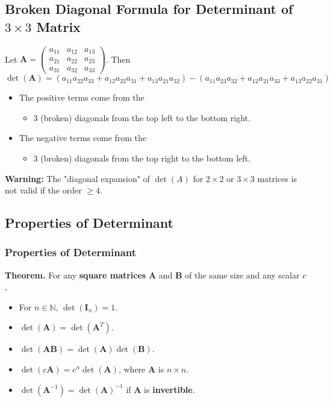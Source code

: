 \documentclass[../ma2001_notes.tex]{subfiles}
\begin{document}
\subsection{Broken Diagonal Formula for Determinant of $3\times 3$ Matrix}
Let \(\bm{A}=\begin{pmatrix}
	a_{11} & a_{12} & a_{13} \\ a_{21} & a_{22} & a_{23} \\
	a_{31} & a_{32} & a_{33}
\end{pmatrix}\). Then
\[\det(\bm{A})=(a_{11}a_{22}a_{33}+a_{12}a_{23}a_{31}+a_{13}a_{21}a_{32})-(a_{11}a_{23}a_{32}+a_{12}a_{21}a_{33}+a_{13}a_{22}a_{31})\]
\begin{itemize}
	\item The positive terms come from the
	\begin{itemize}
		\item 3 (broken) diagonals from the top left to the bottom right.
	\end{itemize}
	\item The negative terms come from the
	\begin{itemize}
		\item 3 (broken) diagonals from the top right to the bottom left.
	\end{itemize}
\end{itemize}
\textbf{Warning:} The "diagonal expansion" of \(\det(A)\) for \(2\times2\) or \(3\times3\) matrices is not valid if the order \(\geq4\).

\subsection{Properties of Determinant}
\subsubsection{Properties of Determinant}
\textbf{Theorem.} For any \textbf{square matrices} \(\bm{A}\) and \(\bm{B}\) of the same size and any scalar \(c\),
\begin{itemize}
	\item For \(n\in\mathbb{N}\), \(\det(\bm{I}_n)=1\).
	\item\(\det(\bm{A})=\det(\bm{A}^T)\).
	\item\(\det(\bm{AB})=\det(\bm{A})\det(\bm{B})\).
	\item\(\det(c\bm{A})=c^n\det(\bm{A})\), where \(\bm{A}\) is \(n\times n\).
	\item\(\det(\bm{A}^{-1})=\det(\bm{A})^{-1}\) if \(\bm{A}\) is \textbf{invertible}.
\end{itemize}
\end{document}
